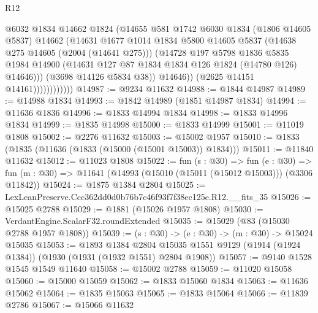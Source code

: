 \begin{lexlean}{R12}
\begin{coremodule}
                              @6032
                              @1834
                              @14662
                              @1824
                              (@14655
                                @581
                                @1742
                                @6030
                                @1834
                                (@1806 @14605 @5837)
                                @14662
                                (@14631
                                  @1677
                                  @1014
                                  @1834
                                  @5800
                                  @14605
                                  @5837
                                  (@14638 @275 @14605 (@2004 (@14641 @275)))
                                  (@14728
                                    @197
                                    @5798
                                    @1836
                                    @5835
                                    @1984
                                    @14900
                                    (@14631 @127 @87 @1834 @1834 @126 @1824 (@14780 @126) @14646)))
                                (@3698 @14126 @5834 @38))
                              @14646))
                          (@2625 @14151 @14161))))))))))))
@14987 := @9234 @11632
@14988 := @1844 @14987
@14989 := @14988 @1834
@14993 := @1842 @14989 (@1851 @14987 @1834)
@14994 := @11636 @1836
@14996 := @1833 @14994 @1834
@14998 := @1833 @14996 @1834
@14999 := @1835 @14998
@15000 := @1833 @14999
@15001 := @11019 @1808
@15002 := @2276 @11632
@15003 := @15002 @1957
@15010 := @1833 (@1835 (@11636 (@1833 (@15000 (@15001 @15003)) @1834)))
@15011 := @11840 @11632
@15012 := @11023 @1808
@15022 := fun (s : @30) =>
  fun (e : @30) => fun (m : @30) => @11641 (@14993 (@15010 (@15011 (@15012 @15003))) (@3306 @11842))
@15024 := @1875 @1384 @2804
@15025 := LexLeanPreserve.Ccc362dd0d0b76b7c46f93f7f38ec125e.R12.__fits_35
@15026 := @15025 @2788
@15029 := @1881 (@15026 @1957 @1808)
@15030 := VerdantEngine.ScalarF32.roundExtended
@15035 := @15029 (@83 (@15030 @2788 @1957 @1808))
@15039 := (s : @30) -> (e : @30) -> (m : @30) -> @15024 @15035
@15053 := @1893
    @1384
    @2804
    @15035
    @1551
    @9129
    (@1914 (@1924 @1384))
    (@1930 (@1931 (@1932 @1551) @2804 @1908))
@15057 := @9140 @1528 @1545 @1549 @11640
@15058 := @15002 @2788
@15059 := @11020 @15058
@15060 := @15000 @15059
@15062 := @1833 @15060 @1834
@15063 := @11636 @15062
@15064 := @1835 @15063
@15065 := @1833 @15064
@15066 := @11839 @2786
@15067 := @15066 @11632

\end{coremodule}
\end{lexlean}
